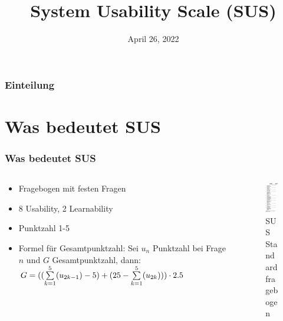 \documentclass[12pt, aspectratio=169]{beamer}
\title{System Usability Scale (SUS)}
\author[Y. Höll, F. Jäpel]{}
\date{April 26, 2022}
\begin{document}
\frame{\titlepage}

\begin{frame}
	\frametitle{Einteilung}
	\tableofcontents
\end{frame}

\section{Was bedeutet SUS}
\begin{frame}
	\frametitle{Was bedeutet SUS}
	\begin{columns}
		\begin{column}{0.7\textwidth}
			\begin{itemize}
				\item<1> Fragebogen mit festen Fragen
				\item<1> 8 Usability, 2 Learnability
				\item<1> Punktzahl 1-5
				\item<1> Formel für Gesamtpunktzahl: 
				Sei $u_n$ Punktzahl bei Frage $n$ und $G$ Gesamtpunktzahl, dann:
				\begin{math} G=((\sum\limits_{k=1}^5(u_{2k-1})-5) + (25-\sum\limits_{k=1}^5(u_{2k}))) \cdot 2.5 $\\$ \end{math}
			\end{itemize}
		\end{column}
		\begin{column}{0.3\textwidth}
			\begin{figure}
				\centering
				\includegraphics[keepaspectratio=true, width=65px]{./image/sus.png}
				\caption{SUS Standardfragebogen \tiny{\cite{wiki1}}}
			\end{figure}		
		\end{column}
	\end{columns}
\end{frame}
\end{document}
